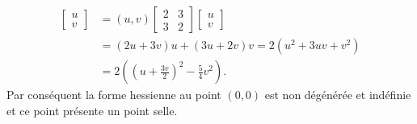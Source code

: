 {\begin{enumerate}
{\begin{align*}
\left[\begin{matrix} u \\ v \end{matrix}\right]&=
(u,v)\left[\begin{matrix} 
2 & 3\\ 3 &  2
\end{matrix}\right]
\left[\begin{matrix} u \\ v \end{matrix}\right]
\\
&=
(2u+3v)u+(3u+2v)v=2(u^2+3uv+v^2)
\\
&=
2\left(\left(u+\tfrac {3v}2\right)^2 - \tfrac 54 v^2\right) .
\end{align*}
Par cons\'equent la forme hessienne au point $(0,0)$
est non d\'eg\'en\'er\'ee et 
ind\'efinie et ce point pr\'esente  un point selle.}
\end{enumerate}
}